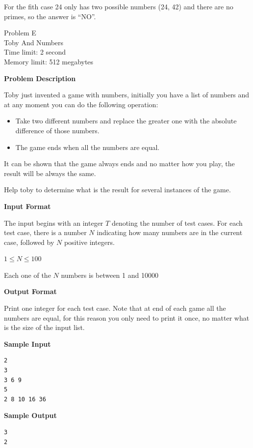 \documentclass[11pt]{article}
\begin{document}
For the fith case 24 only has two possible numbers (24, 42) and there are no primes, so the
answer is ``NO''.

\newpage
        \begin{center}
            {\LARGE Problem E}\\
            {\Large Toby And Numbers}\\
            {Time limit: 2 second}\\
            {Memory limit: 512 megabytes}
        \end{center}\textbf{\large Problem Description}

Toby just invented a game with numbers, initially you have a list of numbers
and at any moment you can do the following operation:

\begin{itemize}
    \item Take two different numbers and replace the greater one with the absolute
    difference of those numbers.
    \item The game ends when all the numbers are equal.
\end{itemize}

It can be shown that the game always ends and no matter how you play, the result
will be always the same.

Help toby to determine what is the result for several instances of the game.

\textbf{\large Input Format}

The input begins with an integer $T$ denoting the number of test cases. For each
test case, there is a number $N$ indicating how many numbers are in the current case,
followed by $N$ positive integers.

$1 \le N \le 100$

Each one of the $N$ numbers is between 1 and 10000

\textbf{\large Output Format}

Print one integer for each test case. Note that at end of each game all the
numbers are equal, for this reason you only need to print it once, no matter what
is the size of the input list.

\textbf{\large Sample Input}

\begin{verbatim}
2
3
3 6 9
5
2 8 10 16 36
\end{verbatim}

\textbf{\large Sample Output}

\begin{verbatim}
3
2
\end{verbatim}
\end{document}
